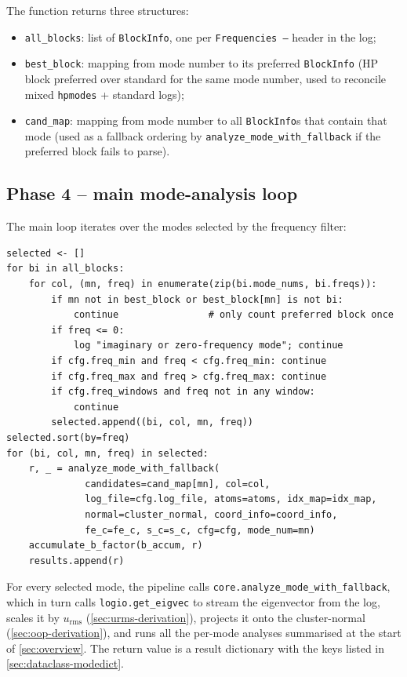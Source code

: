 \documentclass[10pt,a4paper,twoside]{article}
\newcommand{\urms}{u_{\mathrm{rms}}}
\newcommand{\codref}[1]{%
  \quad\text{\textcolor{gray!70!black}{\footnotesize $\rightsquigarrow$~\texttt{#1}}}}
\newcommand{\fn}[1]{\texttt{#1}}
\begin{document}
The function returns three structures:

\begin{itemize}
  \item \fn{all\_blocks}: list of \fn{BlockInfo}, one per
        \texttt{Frequencies --} header in the log;
  \item \fn{best\_block}: mapping from mode number to its preferred
        \fn{BlockInfo} (HP block preferred over standard for the same
        mode number, used to reconcile mixed \texttt{hpmodes} +
        standard logs);
  \item \fn{cand\_map}: mapping from mode number to all
        \fn{BlockInfo}s that contain that mode (used as a fallback
        ordering by \fn{analyze\_mode\_with\_fallback} if the
        preferred block fails to parse).
\end{itemize}

\subsection{Phase 4 -- main mode-analysis loop}
\label{sec:phase4-loop}

\codref{runner.\_run\_analysis\_single}

The main loop iterates over the modes selected by the frequency
filter:

\begin{lstlisting}[style=pseudo,caption={Main mode-analysis loop, schematic.}]
selected <- []
for bi in all_blocks:
    for col, (mn, freq) in enumerate(zip(bi.mode_nums, bi.freqs)):
        if mn not in best_block or best_block[mn] is not bi:
            continue                # only count preferred block once
        if freq <= 0:
            log "imaginary or zero-frequency mode"; continue
        if cfg.freq_min and freq < cfg.freq_min: continue
        if cfg.freq_max and freq > cfg.freq_max: continue
        if cfg.freq_windows and freq not in any window:
            continue
        selected.append((bi, col, mn, freq))
selected.sort(by=freq)
for (bi, col, mn, freq) in selected:
    r, _ = analyze_mode_with_fallback(
              candidates=cand_map[mn], col=col,
              log_file=cfg.log_file, atoms=atoms, idx_map=idx_map,
              normal=cluster_normal, coord_info=coord_info,
              fe_c=fe_c, s_c=s_c, cfg=cfg, mode_num=mn)
    accumulate_b_factor(b_accum, r)
    results.append(r)
\end{lstlisting}

For every selected mode, the pipeline calls \fn{core.analyze\_mode\_with\_fallback},
which in turn calls \fn{logio.get\_eigvec} to stream
the eigenvector from the log, scales it by $\urms$ (\cref{sec:urms-derivation}),
projects it onto the cluster-normal (\cref{sec:oop-derivation}), and
runs all the per-mode analyses summarised at the start of
\cref{sec:overview}. The return value is a result dictionary with
the keys listed in \cref{sec:dataclass-modedict}.
\end{document}
